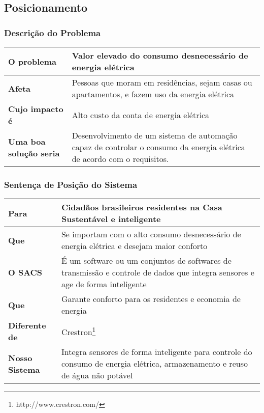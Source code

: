 \subsection{Posicionamento}

\subsubsection{Descrição do Problema}

\begin{longtable}{|l|m{7cm}|}
	\hline \textbf{O problema} & Valor elevado do consumo desnecessário de energia elétrica\\
	\hline \textbf{Afeta} & Pessoas que moram em residências, sejam casas ou apartamentos, e fazem uso da energia elétrica\\
	\hline \textbf{Cujo impacto é} & Alto custo da conta de energia elétrica\\
	\hline \textbf{Uma boa solução seria} & Desenvolvimento de um sistema de automação capaz de controlar o consumo da energia elétrica de acordo com o requisitos.\\
	\hline
\end{longtable}

\subsubsection{Sentença de Posição do Sistema}

\begin{longtable}{|l|m{7cm}|}
	\hline \textbf{Para} & Cidadãos brasileiros residentes na Casa Sustentável e inteligente \\
	\hline \textbf{Que} & Se importam com o alto consumo desnecessário de energia elétrica e desejam maior conforto\\
	\hline \textbf{O \gls{SACS}} & É um software ou um conjuntos de softwares de transmissão e controle de dados que integra sensores e age de forma inteligente\\
	\hline \textbf{Que} & Garante conforto para os residentes e economia de energia\\
	\hline \textbf{Diferente de} & Crestron\footnote{http://www.crestron.com/}\\
	\hline \textbf{Nosso Sistema} & Integra sensores de forma inteligente para controle do consumo de energia elétrica, armazenamento e reuso de água não potável\\
	\hline
\end{longtable}

